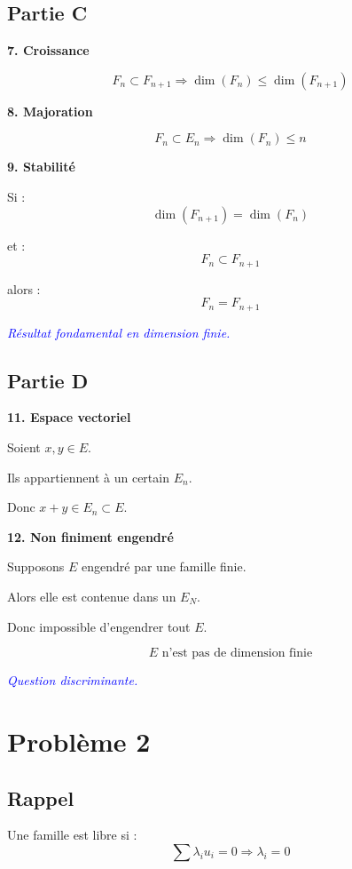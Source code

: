 \documentclass[11pt,a4paper]{article}
\newcommand{\commentaire}[1]{\textcolor{blue}{\textit{#1}}}
\begin{document}
\subsection*{Partie C}

\textbf{7. Croissance}

\[
F_n \subset F_{n+1} \Rightarrow \dim(F_n) \leq \dim(F_{n+1})
\]

\textbf{8. Majoration}

\[
F_n \subset E_n \Rightarrow \dim(F_n) \leq n
\]

\textbf{9. Stabilité}

Si :
\[
\dim(F_{n+1})=\dim(F_n)
\]

et :
\[
F_n \subset F_{n+1}
\]

alors :
\[
\boxed{F_n=F_{n+1}}
\]

\commentaire{Résultat fondamental en dimension finie.}

\subsection*{Partie D}

\textbf{11. Espace vectoriel}

Soient $x,y \in E$.

Ils appartiennent à un certain $E_n$.

Donc $x+y \in E_n \subset E$.

\textbf{12. Non finiment engendré}

Supposons $E$ engendré par une famille finie.

Alors elle est contenue dans un $E_N$.

Donc impossible d’engendrer tout $E$.

\[
\boxed{E \text{ n’est pas de dimension finie}}
\]

\commentaire{Question discriminante.}

\section*{Problème 2}

\subsection*{Rappel}

Une famille est libre si :
\[
\sum \lambda_i u_i =0 \Rightarrow \lambda_i=0
\]
\end{document}
